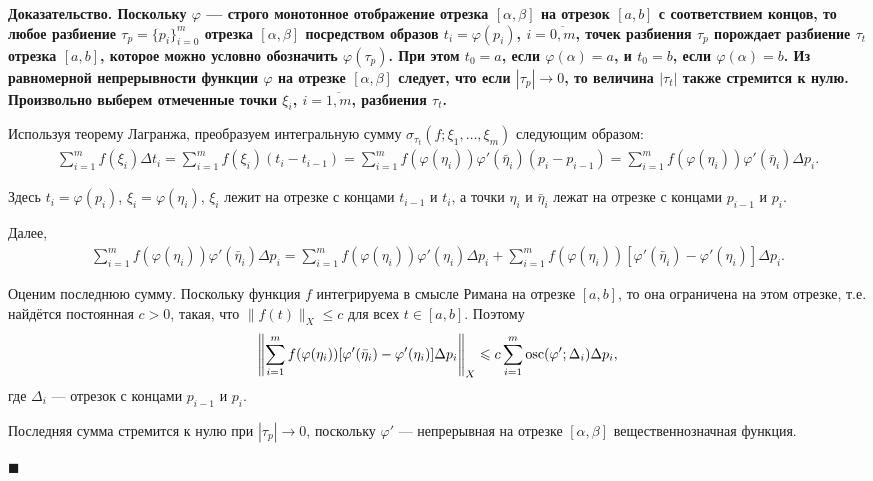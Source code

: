 \documentclass{report}
\newenvironment{Proof}{\par\noindent\bf Доказательство.\rm}{ $\blacksquare$\par}
\newcommand{\osc}{\mathop{\rm osc}\nolimits}
\begin{document}
\begin{Proof}
Поскольку $\varphi$ --- строго монотонное отображение отрезка $[\alpha,\beta]$ на отрезок $[a,b]$ с соответствием концов, то любое разбиение $\tau_p=\{p_i\}_{i=0}^m$ отрезка
$[\alpha,\beta]$ посредством образов $t_i=\varphi(p_i)$, $i=\overline{0,m}$, точек разбиения $\tau_p$ порождает разбиение $\tau_t$ отрезка $[a,b]$, которое можно условно обозначить
$\varphi(\tau_p)$. При этом $t_0=a$, если $\varphi(\alpha)=a$, и $t_0=b$, если $\varphi(\alpha)=b$. Из равномерной непрерывности функции $\varphi$ на отрезке $[\alpha,\beta]$ следует, что
если $|\tau_p|\to0$, то величина $|\tau_t|$ также стремится к нулю. Произвольно выберем отмеченные точки $\xi_i$, $i=\overline{1,m}$, разбиения $\tau_t$.

Используя теорему Лагранжа, преобразуем интегральную сумму $\sigma_{\tau_t}(f;\xi_1,\dots,\xi_m)$ следующим образом:
\begin{gather*}
\sum\limits_{i=1}^mf(\xi_i)\Delta t_i=\sum\limits_{i=1}^mf(\xi_i)(t_i-t_{i-1})=
\sum\limits_{i=1}^mf(\varphi(\eta_i))\varphi'(\bar\eta_i)(p_i-p_{i-1})=\sum\limits_{i=1}^mf(\varphi(\eta_i))\varphi'(\bar\eta_i)\Delta p_i.
\end{gather*}

Здесь $t_i=\varphi(p_i)$, $\xi_i=\varphi(\eta_i)$, $\xi_i$ лежит на отрезке с концами $t_{i-1}$ и $t_i$, а точки $\eta_i$ и $\bar\eta_i$ лежат на отрезке с концами $p_{i-1}$ и $p_i$.

Далее,
\begin{gather*}
\sum\limits_{i=1}^mf(\varphi(\eta_i))\varphi'(\bar\eta_i)\Delta p_i=\sum\limits_{i=1}^mf(\varphi(\eta_i))\varphi'(\eta_i)\Delta p_i+
\sum\limits_{i=1}^mf(\varphi(\eta_i))[\varphi'(\bar\eta_i)-\varphi'(\eta_i)]\Delta p_i.
\end{gather*}

Оценим последнюю сумму. Поскольку функция $f$ интегрируема в смысле Римана на отрезке $[a,b]$, то она ограничена на этом отрезке, т.е.
найдётся постоянная $c>0$, такая, что $\|f(t)\|_X\leqslant c$ для всех $t\in[a,b]$. Поэтому
\begin{gather*}
\left\|\sum\limits_{i=1}^mf(\varphi(\eta_i))[\varphi'(\bar\eta_i)-\varphi'(\eta_i)]\Delta p_i\right\|_X\leqslant
c\sum\limits_{i=1}^m\osc(\varphi';\Delta_i)\Delta p_i,
\end{gather*}
где $\Delta_i$ --- отрезок с концами $p_{i-1}$ и $p_i$.

Последняя сумма стремится к нулю при $|\tau_p|\to0$, поскольку $\varphi'$ --- непрерывная на отрезке $[\alpha,\beta]$ вещественнозначная функция.


\end{Proof}
\end{document}
